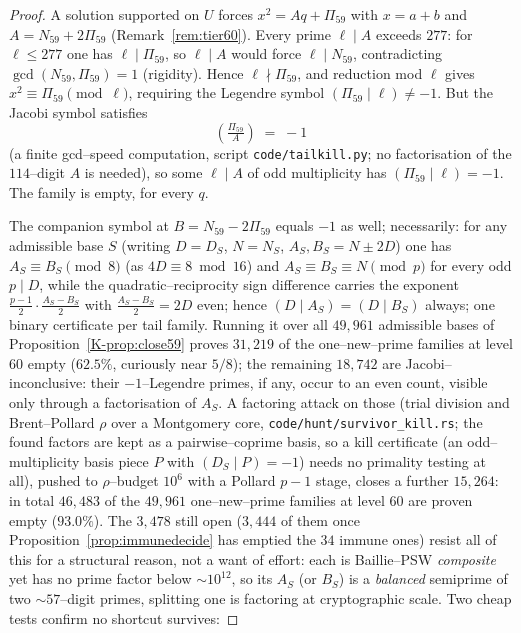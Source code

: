 \documentclass[11pt]{article}
\theoremstyle{definition}
\begin{document}
\begin{proof}
A solution supported on $U$ forces $x^2=Aq+\Pi_{59}$ with $x=a+b$ and $A=N_{59}+2\Pi_{59}$
(Remark~\ref{rem:tier60}). Every prime $\ell\mid A$ exceeds $277$: for $\ell\le277$ one has
$\ell\mid\Pi_{59}$, so $\ell\mid A$ would force $\ell\mid N_{59}$, contradicting
$\gcd(N_{59},\Pi_{59})=1$ (rigidity). Hence $\ell\nmid\Pi_{59}$, and reduction mod $\ell$ gives
$x^2\equiv\Pi_{59}\pmod\ell$, requiring the Legendre symbol $(\Pi_{59}\mid\ell)\neq-1$. But the
Jacobi symbol satisfies
\[ \left(\tfrac{\Pi_{59}}{A}\right)\;=\;-1 \]
(a finite gcd--speed computation, script \texttt{code/tailkill.py}; no factorisation of the
$114$--digit $A$ is needed), so some $\ell\mid A$ of odd multiplicity has $(\Pi_{59}\mid\ell)=-1$.
The family is empty, for every $q$.

The companion symbol at $B=N_{59}-2\Pi_{59}$ equals $-1$ as well; necessarily: for any
admissible base $S$ (writing $D=D_S$, $N=N_S$, $A_S,B_S=N\pm2D$) one has $A_S\equiv B_S\pmod 8$
(as $4D\equiv8\bmod{16}$) and $A_S\equiv B_S\equiv N\pmod p$ for every odd $p\mid D$, while the
quadratic--reciprocity sign difference carries the exponent $\tfrac{p-1}{2}\cdot\tfrac{A_S-B_S}{2}$
with $\tfrac{A_S-B_S}{2}=2D$ even; hence $(D\mid A_S)=(D\mid B_S)$ always; one binary
certificate per tail family. Running it over all $49{,}961$ admissible bases of
Proposition~\ref{K-prop:close59} proves $31{,}219$ of the one--new--prime families at level $60$
empty ($62.5\%$, curiously near $5/8$); the remaining $18{,}742$ are Jacobi--inconclusive: their
$-1$--Legendre primes, if any, occur to an even count, visible only through a factorisation of
$A_S$. A factoring attack on those (trial division and Brent--Pollard $\rho$ over a Montgomery
core, \texttt{code/hunt/survivor\_kill.rs}; the found factors are kept as a pairwise--coprime basis, so
a kill certificate (an odd--multiplicity basis piece $P$ with $(D_S\mid P)=-1$) needs no
primality testing at all), pushed to $\rho$--budget $10^6$ with a Pollard $p-1$ stage, closes a
further $15{,}264$: in total $46{,}483$ of the $49{,}961$ one--new--prime families at level $60$
are proven empty ($93.0\%$). The $3{,}478$ still open ($3{,}444$ of them once
Proposition~\ref{prop:immunedecide} has emptied the $34$ immune ones) resist all of this for a
structural reason,
not a want of effort: each is Baillie--PSW \emph{composite} yet has no prime factor below ${\sim}
10^{12}$, so its $A_S$ (or $B_S$) is a \emph{balanced} semiprime of two ${\sim}57$--digit primes,
splitting one is factoring at cryptographic scale. Two cheap tests confirm no shortcut survives:

\end{proof}
\end{document}
